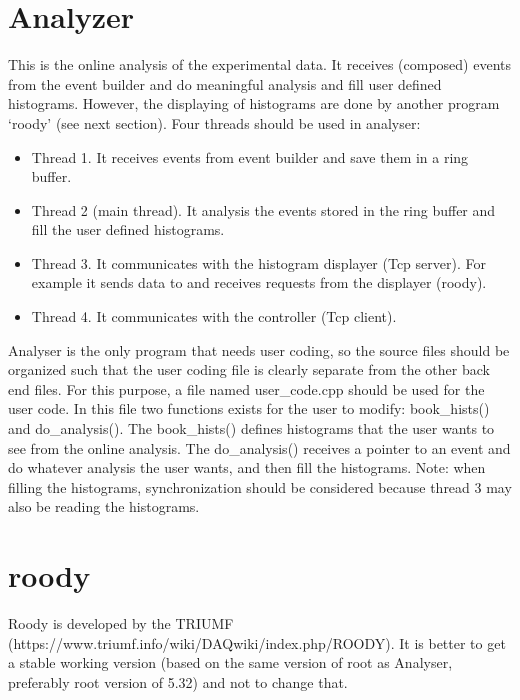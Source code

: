 \documentclass[a4paper,12pt]{article}
\begin{document}
	\section{Analyzer}
	This is the online analysis of the experimental data. It receives
	(composed) events from the event builder and do meaningful analysis and
	fill user defined histograms. However, the displaying of histograms are
	done by another program `roody' (see next section).
	Four threads should be used in analyser:
	\begin{itemize}
		\item Thread 1. It receives events from event builder and save them
			in a ring buffer.
		\item Thread 2 (main thread). It analysis the events stored in the
			ring buffer and fill the user defined histograms.
		\item Thread 3. It communicates with the histogram displayer (Tcp
			server). For example it sends data to and receives requests from
			the displayer (roody).
		\item Thread 4. It communicates with the controller (Tcp client).
	\end{itemize}
	Analyser is the only program that needs user coding, so the source files
	should be organized such that the user coding file is clearly separate
	from the other back end files. For this purpose, a file named
	user\_code.cpp should be used for the user code. In this file two
	functions exists for the user to modify: book\_hists() and
	do\_analysis(). The  book\_hists() defines histograms that the user
	wants to see from the online analysis. The do\_analysis() receives a
	pointer to an event and do whatever analysis the user wants, and then
	fill the histograms. Note: when filling the histograms, synchronization
	should be considered because thread 3 may also be reading the
	histograms.

	\section{roody}
	Roody is developed by the TRIUMF
	(https://www.triumf.info/wiki/DAQwiki/index.php/ROODY). It is better to
	get a stable working version (based on the same version of root as
	Analyser, preferably root version of 5.32) and not to change that. 
\end{document}
